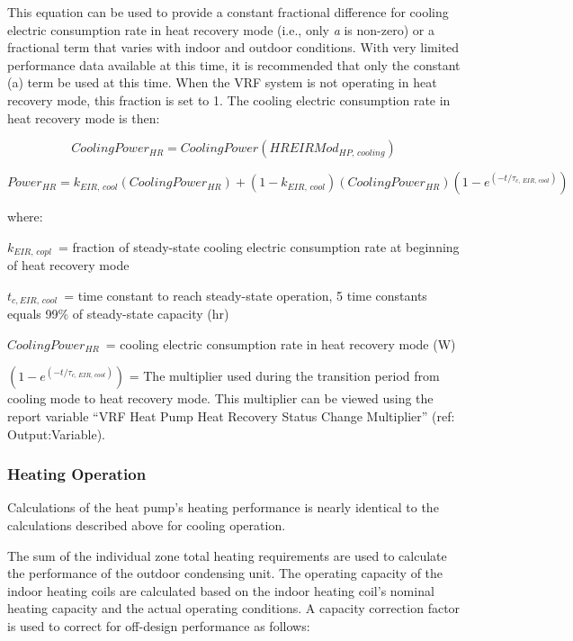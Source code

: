 This equation can be used to provide a constant fractional difference for cooling electric consumption rate in heat recovery mode (i.e., only \emph{a} is non-zero) or a fractional term that varies with indoor and outdoor conditions. With very limited performance data available at this time, it is recommended that only the constant (a) term be used at this time. When the VRF system is not operating in heat recovery mode, this fraction is set to 1. The cooling electric consumption rate in heat recovery mode is then:

\begin{equation}
  CoolingPower_{HR} = CoolingPower \left( HREIRMod_{HP,\,cooling} \right)
\end{equation}

\begin{equation}
  Power_{HR} = k_{EIR,\,cool} \left( CoolingPower_{HR} \right) + \left( 1 - k_{EIR,\,cool} \right) \left( CoolingPower_{HR} \right) \left( 1 - e^{\left( -t / \tau_{c,\,EIR,\,cool} \right)} \right)
\end{equation}
  
where:

\(k_{EIR,\, copl}\) = fraction of steady-state cooling electric consumption rate at beginning of heat recovery mode

\(t_{c,EIR,\, cool}\) = time constant to reach steady-state operation, 5 time constants equals 99\% of steady-state capacity (hr)

\(CoolingPower_{HR}\) = cooling electric consumption rate in heat recovery mode (W)

\(\left( 1 - e^{\left( -t / \tau_{c,\,EIR,\,cool} \right)} \right)\) = The multiplier used during the transition period from cooling mode to heat recovery mode. This multiplier can be viewed using the report variable ``VRF Heat Pump Heat Recovery Status Change Multiplier'' (ref: Output:Variable).

\subsubsection{Heating Operation}\label{heating-operation}

Calculations of the heat pump's heating performance is nearly identical to the calculations described above for cooling operation.

The sum of the individual zone total heating requirements are used to calculate the performance of the outdoor condensing unit. The operating capacity of the indoor heating coils are calculated based on the indoor heating coil's nominal heating capacity and the actual operating conditions. A capacity correction factor is used to correct for off-design performance as follows:

